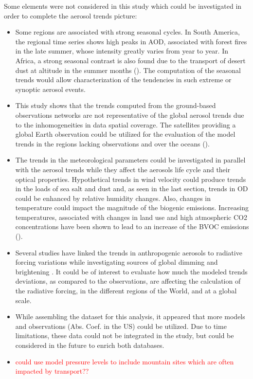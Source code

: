 \documentclass[journal abbreviation, manuscript]{copernicus}
\begin{document}
Some elements were not considered in this study which could be investigated in order to complete the aerosol trends picture:
\begin{itemize}
 \item Some regions are associated with strong seasonal cycles. In South America, the regional time series shows high peaks in AOD, associated with forest fires in the late summer, whose intensity greatly varies from year to year. In Africa, a strong seasonal contrast is also found due to the transport of desert dust at altitude in the summer months (\cite{mortier2016, ogunjobi2008synoptic}). The computation of the seasonal trends would allow characterization of the tendencies in such extreme or synoptic aerosol events.
 \item  This study shows that the trends computed from the ground-based observations networks are not representative of the global aerosol trends due to the inhomogeneities in data spatial coverage. The satellites providing a global Earth observation could be utilized for the evaluation of the model trends in the regions lacking observations and over the oceans (\cite{hsu2012global,zhang2010decadal}).
 \item The trends in the meteorological parameters could be investigated in parallel with the aerosol trends while they affect the aerosols life cycle and their optical properties. Hypothetical trends in wind velocity could produce trends in the loads of sea salt and dust and, as seen in the last section, trends in OD could be enhanced by relative humidity changes. Also, changes in temperature could impact the magnitude of the biogenic emissions. Increasing temperatures, associated with changes in land use and high atmospheric CO2 concentrations have been shown to lead to an increase of the BVOC emissions (\cite{penuelas2010bvocs}).
 \item Several studies have linked the trends in anthropogenic aerosols to radiative forcing variations while investigating sources of global dimming and brightening \cite{streets2006two,norris2007trends}. It could be of interest to evaluate how much the modeled trends deviations, as compared to the observations, are affecting the calculation of the radiative forcing, in the different regions of the World, and at a global scale.
 \item While assembling the dataset for this analysis, it appeared that more models and observations (Abs. Coef. in the US) could be utilized. Due to time limitations, these data could not be integrated in the study, but could be considered in the future to enrich both databases.
 \item \textcolor{red}{could use model pressure levels to include mountain sites which are often impacted by transport??}
\end{itemize}
\end{document}
